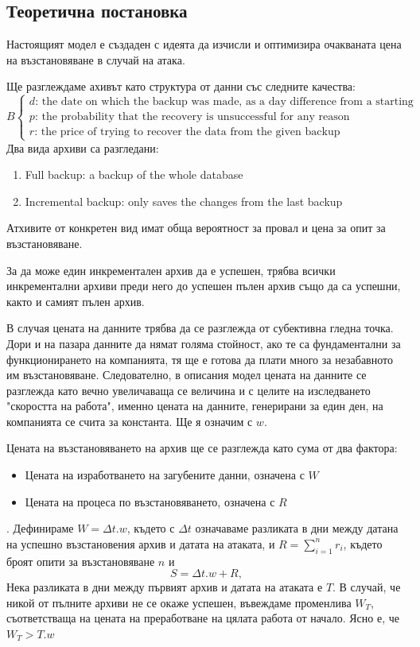 \documentclass[11pt, a4paper]{article}
\theoremstyle{definition}
\begin{document}
		\subsection{Теоретична постановка}
			Настоящият модел е създаден с идеята да изчисли и оптимизира очакваната цена на възстановяване в случай на атака.\par
			Ще разглеждаме ахивът като структура от данни със следните качества:
			$$
			B
			\begin{cases}
			d \text{: the date on which the backup was made, as a day difference from a starting point}\\
			p \text{: the probability that the recovery is unsuccessful for any reason}\\
			r \text{: the price of trying to recover the data from the given backup}
			\end{cases}
			$$
			Два вида архиви са разгледани:
			\begin{enumerate}
				\item Full backup: a backup of the whole database
				\item Incremental backup: only saves the changes from the last backup
			\end{enumerate}
			Атхивите от конкретен вид имат обща вероятност за провал и цена за опит за възстановяване. \par
			За да може един инкрементален архив да е успешен, трябва всички инкрементални архиви преди него до успешен пълен архив също да са успешни, както и самият пълен архив.\par
			В случая цената на данните трябва да се разглежда от субективна гледна точка. Дори и на пазара данните да нямат голяма стойност, ако те са фундаментални за функционирането на компанията, тя ще е готова да плати много за незабавното им възстановяване. Следователно, в описания модел цената на данните се разглежда като вечно увеличаваща се величина и с целите на изследването "скоростта на работа", именно цената на данните, генерирани за един ден, на компанията се счита за константа. Ще я означим с $w$.\par
			Цената на възстановяването на архив ще се разглежда като сума от два фактора:
			\begin{itemize}
				\item Цената на изработването на загубените данни, означена с $W$
				\item Цената на процеса по възстановяването, означена с $R$
			\end{itemize}.
			Дефинираме $W = \Delta t.w$, където с $\Delta t$ означаваме разликата в дни между датана на успешно възстановения архив и датата на атаката, и $R = \sum_{i=1}^{n} r_i$, където броят опити за възстановяване $n$ и 
			$$
			S=\Delta t.w + R,
			$$
			Нека разликата в дни между първият архив и датата на атаката е $T$. В случай, че никой от пълните архиви не се окаже успешен, въвеждаме променлива $W_T$, съответстваща на цената на преработване на цялата работа от начало. Ясно е, че $W_T>T.w$\par
\end{document}
